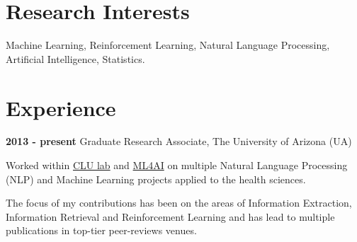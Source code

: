 \documentclass[letterpaper]{article}
\renewenvironment{itemize}{
  \begin{list}{}{
    \setlength{\leftmargin}{1.5em}
  }
}{
  \end{list}
}
\begin{document}
\section*{Research Interests}
Machine Learning, Reinforcement Learning, Natural Language Processing, Artificial Intelligence, Statistics.

\section*{Experience}

\begin{itemize}
\item \textbf{2013 - present} Graduate Research Associate, The University of Arizona (UA)
\item \begin{itemize}
	\item Worked within \href{http://clulab.cs.arizona.edu}{CLU lab} and \href{https://ml4ai.github.io}{ML4AI} on multiple Natural Language Processing (NLP) and Machine Learning projects applied to the  health sciences.

 The focus of my contributions has been on the areas of Information Extraction, Information Retrieval and Reinforcement Learning and has lead to multiple publications in top-tier peer-reviews venues. 
 

\end{itemize}
\end{itemize}
\end{document}
